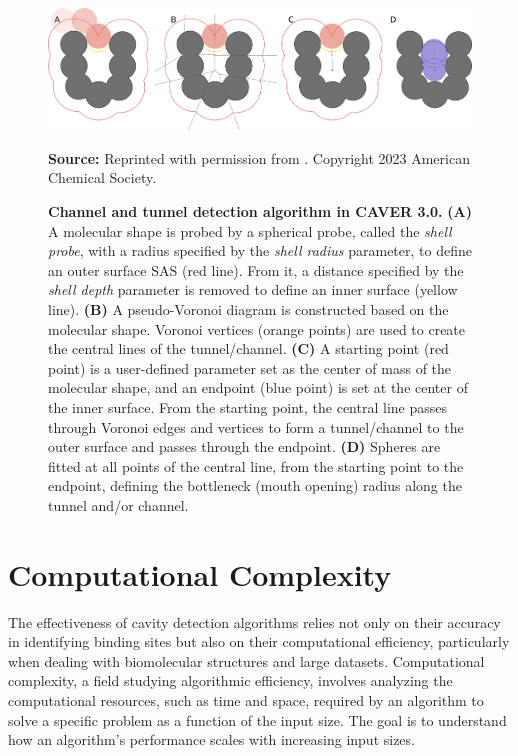 \documentclass[Ingles]{phdthesis}
\begin{document}
\begin{figure}[H]
  \centerline{\includegraphics[scale=1.1]{images/caver-schema.png}}
  \centerline{\tiny{\textbf{Source:} Reprinted with permission from \cite{guerra2023B}. Copyright 2023 American Chemical Society.}}
  \caption[Channel and tunnel detection algorithm in CAVER 3.0]{\textbf{Channel and tunnel detection algorithm in CAVER 3.0.} \textbf{(A)} A molecular shape is probed by a spherical probe, called the \textit{shell probe}, with a radius specified by the \textit{shell radius} parameter, to define an outer surface SAS (red line). From it, a distance specified by the \textit{shell depth} parameter is removed to define an inner surface (yellow line). \textbf{(B)} A pseudo-Voronoi diagram is constructed based on the molecular shape. Voronoi vertices (orange points) are used to create the central lines of the tunnel/channel. \textbf{(C)} A starting point (red point) is a user-defined parameter set as the center of mass of the molecular shape, and an endpoint (blue point) is set at the center of the inner surface. From the starting point, the central line passes through Voronoi edges and vertices to form a tunnel/channel to the outer surface and passes through the endpoint. \textbf{(D)} Spheres are fitted at all points of the central line, from the starting point to the endpoint, defining the bottleneck (mouth opening) radius along the tunnel and/or channel.}
  \label{fig:caver-schema}
\end{figure}

\section{Computational Complexity \label{sec:computational-complexity}}

The effectiveness of cavity detection algorithms relies not only on their accuracy in identifying binding sites but also on their computational efficiency, particularly when dealing with biomolecular structures and large datasets. Computational complexity, a field studying algorithmic efficiency, involves analyzing the computational resources, such as time and space, required by an algorithm to solve a specific problem as a function of the input size. The goal is to understand how an algorithm's performance scales with increasing input sizes.
\end{document}
